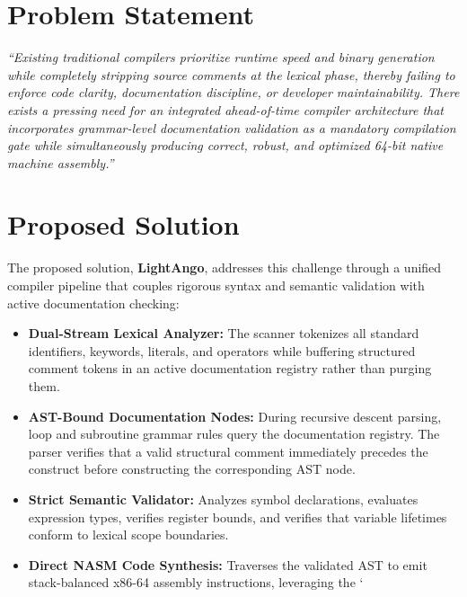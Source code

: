 \section{Problem Statement}
\textit{“Existing traditional compilers prioritize runtime speed and binary generation while completely stripping source comments at the lexical phase, thereby failing to enforce code clarity, documentation discipline, or developer maintainability. There exists a pressing need for an integrated ahead-of-time compiler architecture that incorporates grammar-level documentation validation as a mandatory compilation gate while simultaneously producing correct, robust, and optimized 64-bit native machine assembly.”}

\section{Proposed Solution}
The proposed solution, \textbf{LightAngo}, addresses this challenge through a unified compiler pipeline that couples rigorous syntax and semantic validation with active documentation checking:
\begin{itemize}
    \item \textbf{Dual-Stream Lexical Analyzer:} The scanner tokenizes all standard identifiers, keywords, literals, and operators while buffering structured comment tokens in an active documentation registry rather than purging them.
    \item \textbf{AST-Bound Documentation Nodes:} During recursive descent parsing, loop and subroutine grammar rules query the documentation registry. The parser verifies that a valid structural comment immediately precedes the construct before constructing the corresponding AST node.
    \item \textbf{Strict Semantic Validator:} Analyzes symbol declarations, evaluates expression types, verifies register bounds, and verifies that variable lifetimes conform to lexical scope boundaries.
    \item \textbf{Direct NASM Code Synthesis:} Traverses the validated AST to emit stack-balanced x86-64 assembly instructions, leveraging the `%
\end{itemize}

